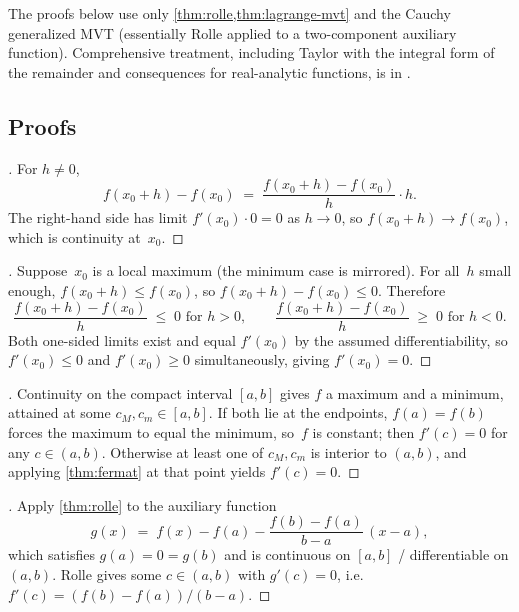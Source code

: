\begin{remark}
The proofs below use only \cref{thm:rolle,thm:lagrange-mvt} and
the Cauchy generalized MVT (essentially Rolle applied to a
two-component auxiliary function). Comprehensive treatment, including
Taylor with the integral form of the remainder and consequences for
real-analytic functions, is in \cite{Zorich1981}.
\end{remark}

\subsection*{Proofs}

\begin{proof}[]
For $h \neq 0$,
\[
  f(x_0 + h) - f(x_0) \;=\; \frac{f(x_0 + h) - f(x_0)}{h} \cdot h.
\]
The right-hand side has limit $f'(x_0) \cdot 0 = 0$ as $h \to 0$, so
$f(x_0 + h) \to f(x_0)$, which is continuity at~$x_0$.
\end{proof}

\begin{proof}[]
Suppose~$x_0$ is a local maximum (the minimum case is mirrored). For
all~$h$ small enough, $f(x_0 + h) \le f(x_0)$, so
$f(x_0 + h) - f(x_0) \le 0$. Therefore
\[
  \frac{f(x_0 + h) - f(x_0)}{h} \;\le\; 0 \text{ for } h > 0,
  \qquad
  \frac{f(x_0 + h) - f(x_0)}{h} \;\ge\; 0 \text{ for } h < 0.
\]
Both one-sided limits exist and equal $f'(x_0)$ by the assumed
differentiability, so $f'(x_0) \le 0$ and $f'(x_0) \ge 0$
simultaneously, giving $f'(x_0) = 0$.
\end{proof}

\begin{proof}[]
Continuity on the compact interval $[a, b]$ gives $f$ a maximum
and a minimum, attained at some $c_M, c_m \in [a, b]$. If both lie
at the endpoints, $f(a) = f(b)$ forces the maximum to equal the
minimum, so~$f$ is constant; then $f'(c) = 0$ for any $c \in (a, b)$.
Otherwise at least one of $c_M, c_m$ is interior to $(a, b)$, and
applying \cref{thm:fermat} at that point yields $f'(c) = 0$.
\end{proof}

\begin{proof}[]
Apply \cref{thm:rolle} to the auxiliary function
\[
  g(x) \;=\; f(x) - f(a) - \frac{f(b) - f(a)}{b - a}\,(x - a),
\]
which satisfies $g(a) = 0 = g(b)$ and is continuous on $[a, b]$ /
differentiable on $(a, b)$. Rolle gives some $c \in (a, b)$ with
$g'(c) = 0$, i.e.\ $f'(c) = (f(b) - f(a))/(b - a)$.
\end{proof}

